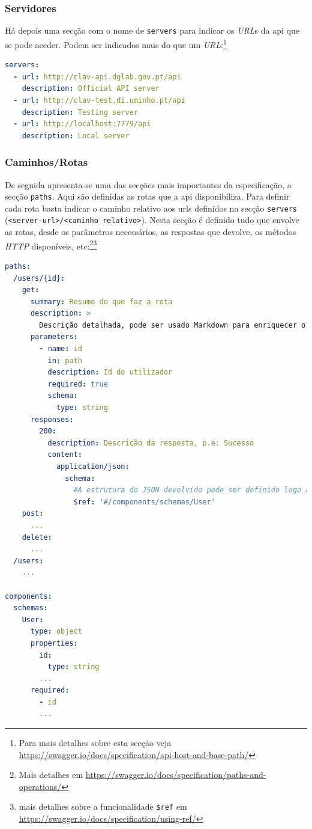 \subsubsection{Servidores}
Há depois uma secção com o nome de \texttt{servers} para indicar os \textit{URL}s da \acrshort{api} que se pode aceder. Podem ser indicados mais do que um \textit{URL}:\footnote{Para mais detalhes sobre esta secção veja \url{https://swagger.io/docs/specification/api-host-and-base-path/}}
\begin{lstlisting}[language=yaml, caption=Exemplo de secção \texttt{servers} indicando os \textit{URL}s e a descrição de cada na especificação \textit{OpenAPI}]
servers:
  - url: http://clav-api.dglab.gov.pt/api
    description: Official API server
  - url: http://clav-test.di.uminho.pt/api
    description: Testing server
  - url: http://localhost:7779/api
    description: Local server
\end{lstlisting}

\vspace{-0.7cm}

\subsubsection{Caminhos/Rotas}
De seguida apresenta-se uma das secções mais importantes da especificação, a secção \texttt{paths}. Aqui são definidas as rotas que a \acrshort{api} disponibiliza. Para definir cada rota basta indicar o caminho relativo aos \acrshort{url}s definidos na secção \texttt{servers} (\verb|<server-url>/<caminho relativo>|). Nesta secção é definido tudo que envolve as rotas, desde os parâmetros necessários, as respostas que devolve, os métodos \textit{HTTP} disponíveis, etc:\footnote{Mais detalhes em \url{https://swagger.io/docs/specification/paths-and-operations/}}\footnote{mais detalhes sobre a funcionalidade \texttt{\$ref} em \url{https://swagger.io/docs/specification/using-ref/}}
\begin{lstlisting}[language=yaml, caption=Exemplo de secção \texttt{paths} indicando os detalhes de cada rota na especificação \textit{OpenAPI}, label={exem:oapiRota}]
paths:
  /users/{id}:
    get:
      summary: Resumo do que faz a rota
      description: >
        Descrição detalhada, pode ser usado Markdown para enriquecer o texto
      parameters:
        - name: id
          in: path
          description: Id do utilizador
          required: true
          schema:
            type: string
      responses:
        200:
          description: Descrição da resposta, p.e: Sucesso
          content:
            application/json:
              schema:
                #A estrutura do JSON devolvido pode ser definido logo aqui ou num componente à parte, fazendo referência desse. Iremos aplicar o segundo caso para demonstrar que estas funcionalidades tornam a documentação mais fácil de manter
                $ref: '#/components/schemas/User'
    post:
      ...
    delete:
      ...
  /users:
    ...

components:
  schemas:
    User:
      type: object
      properties:
        id:
          type: string
        ...
      required:
        - id
        ...
\end{lstlisting}

